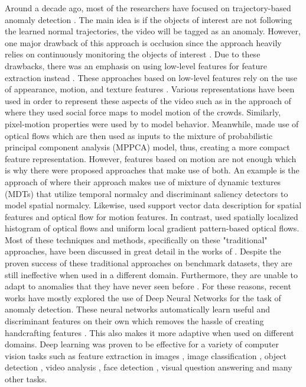 Around a decade ago, most of the researchers have focused on trajectory-based anomaly detection . The main idea is if the objects of interest are not following the learned normal trajectories, the video will be tagged as an anomaly. However, one major drawback of this approach is occlusion since the approach heavily relies on continuously monitoring the objects of interest . Due to these drawbacks, there was an emphasis on using low-level features for feature extraction instead . These approaches based on low-level features rely on the use of appearance, motion, and texture features . Various representations have been used in order to represent these aspects of the video such as in the approach of  where they used social force maps to model motion of the crowds. Similarly, pixel-motion properties were used by  to model behavior. Meanwhile,  made use of optical flows which are then used as inputs to the mixture of probabilistic principal component analysis (MPPCA) model, thus, creating a more compact feature representation. However, features based on motion are not enough which is why there were proposed approaches that make use of both. An example is the approach of  where their approach makes use of mixture of dynamic textures (MDTs) that utilize temporal normalcy and discriminant saliency detectors to model spatial normalcy. Likewise,  used support vector data description for spatial features and optical flow for motion features. In contrast,  used spatially localized histogram of optical flows and uniform local gradient pattern-based optical flows. Most of these techniques and methods, specifically on these "traditional" approaches, have been discussed in great detail in the works of .
Despite the proven success of these traditional approaches on benchmark datasets, they are still ineffective when used in a different domain. Furthermore, they are unable to adapt to anomalies that they have never seen before . For these reasons, recent works have mostly explored the use of Deep Neural Networks for the task of anomaly detection. These neural networks automatically learn useful and discriminant features on their own which removes the hassle of creating handcrafting features . This also makes it more adaptive when used on different domains. Deep learning was proven to be effective for a variety of computer vision tasks such as feature extraction in images , image classification , object detection , video analysis , face detection , visual question answering  and many other tasks.
